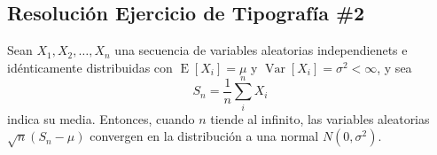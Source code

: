 \documentclass[10pt,a4paper]{article}
\begin{document}
\begin{center}
\section*{Resolución Ejercicio de Tipografía \#2}
\end{center}
Sean $X_1, X_2, \ldots, X_n$ una secuencia de variables aleatorias independienets e idénticamente distribuidas con $\operatorname{E}[X_i] = \mu$ y $\operatorname{Var}[X_i] = \sigma^2 < \infty$,  y sea
\begin{equation*}
S_n = \frac{1}{n}\sum_{i}^{n} X_i
\end{equation*}
indica su media. Entonces, cuando $n$ tiende al infinito, las variables aleatorias $\sqrt{n}(S_n - \mu)$ convergen en la distribución a una normal $N(0, \sigma^2)$.
\\
\end{document}
